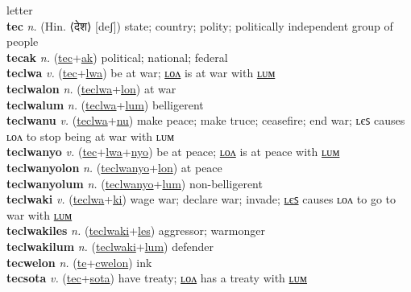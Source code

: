 letter \label{tehwoktilum} \\
\textbf{tec} \textit{n.} (Hin. ⟨देश⟩ [deʃ])
state; country; polity; politically independent group of people \label{tec} \\
\textbf{tecak} \textit{n.} (\hyperref[tec]{tec}+\hyperref[ak]{ak})
political; national; federal \label{tecak} \\
\textbf{teclwa} \textit{v.} (\hyperref[tec]{tec}+\hyperref[lwa]{lwa})
be at war; \hyperref[teclwalon]{ʟᴏᴧ} is at war with \hyperref[teclwalum]{ʟᴜᴍ} \label{teclwa} \\
\textbf{teclwalon} \textit{n.} (\hyperref[teclwa]{teclwa}+\hyperref[lon]{lon})
at war \label{teclwalon} \\
\textbf{teclwalum} \textit{n.} (\hyperref[teclwa]{teclwa}+\hyperref[lum]{lum})
belligerent \label{teclwalum} \\
\textbf{teclwanu} \textit{v.} (\hyperref[teclwa]{teclwa}+\hyperref[nu]{nu})
make peace; make truce; ceasefire; end war; ʟєꜱ causes ʟᴏᴧ to stop being at war with ʟᴜᴍ \label{teclwanu} \\
\textbf{teclwanyo} \textit{v.} (\hyperref[tec]{tec}+\hyperref[lwa]{lwa}+\hyperref[nyo]{nyo})
be at peace; \hyperref[teclwanyolon]{ʟᴏᴧ} is at peace with \hyperref[teclwanyolum]{ʟᴜᴍ} \label{teclwanyo} \\
\textbf{teclwanyolon} \textit{n.} (\hyperref[teclwanyo]{teclwanyo}+\hyperref[lon]{lon})
at peace \label{teclwanyolon} \\
\textbf{teclwanyolum} \textit{n.} (\hyperref[teclwanyo]{teclwanyo}+\hyperref[lum]{lum})
non-belligerent \label{teclwanyolum} \\
\textbf{teclwaki} \textit{v.} (\hyperref[teclwa]{teclwa}+\hyperref[ki]{ki})
wage war; declare war; invade; \hyperref[teclwakiles]{ʟєꜱ} causes ʟᴏᴧ to go to war with \hyperref[teclwakilum]{ʟᴜᴍ} \label{teclwaki} \\
\textbf{teclwakiles} \textit{n.} (\hyperref[teclwaki]{teclwaki}+\hyperref[les]{les})
aggressor; warmonger \label{teclwakiles} \\
\textbf{teclwakilum} \textit{n.} (\hyperref[teclwaki]{teclwaki}+\hyperref[lum]{lum})
defender \label{teclwakilum} \\
\textbf{tecwelon} \textit{n.} (\hyperref[te]{te}+\hyperref[cwelon]{cwelon})
ink \label{tecwelon} \\
\textbf{tecsota} \textit{v.} (\hyperref[tec]{tec}+\hyperref[sota]{sota})
have treaty; \hyperref[tecsotalon]{ʟᴏᴧ} has a treaty with \hyperref[tecsotalum]{ʟᴜᴍ} \label{tecsota} \\
